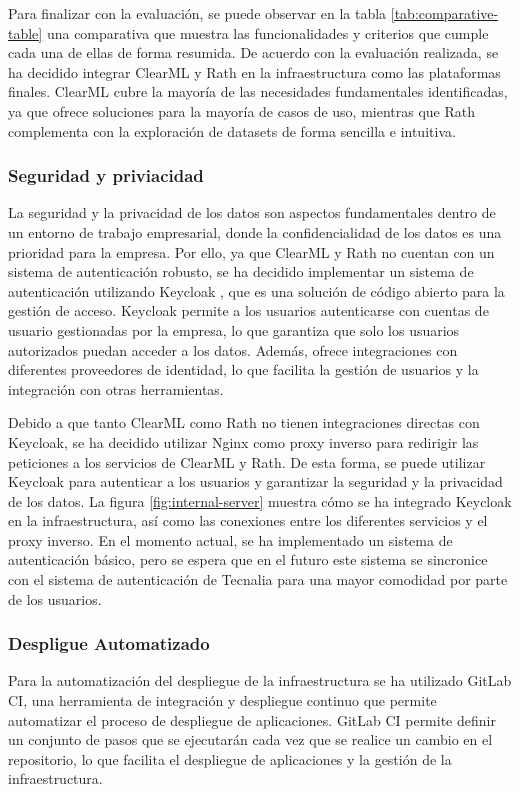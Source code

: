 Para finalizar con la evaluación, se puede observar en la tabla \ref*{tab:comparative-table} 
una comparativa que muestra
las funcionalidades y criterios que cumple cada una de ellas de forma resumida.
De acuerdo con la evaluación realizada, se ha decidido integrar ClearML y Rath
en la infraestructura como las plataformas finales. ClearML cubre la mayoría de
las necesidades fundamentales identificadas, ya que ofrece soluciones para la
mayoría de casos de uso, mientras que Rath complementa con la exploración de
datasets de forma sencilla e intuitiva.  

\subsubsection{Seguridad y priviacidad}
La seguridad y la privacidad de los datos son aspectos fundamentales dentro
de un entorno de trabajo empresarial, donde la confidencialidad de los datos
es una prioridad para la empresa. Por ello, ya que ClearML y Rath no cuentan
con un sistema de autenticación robusto, se ha decidido implementar un sistema
de autenticación utilizando Keycloak \cite{Keycloak}, que es una solución de código abierto
para la gestión de acceso. Keycloak permite a los usuarios autenticarse con
cuentas de usuario gestionadas por la empresa, lo que garantiza que solo los
usuarios autorizados puedan acceder a los datos. Además, ofrece integraciones
con diferentes proveedores de identidad, lo que facilita la gestión de
usuarios y la integración con otras herramientas.\medskip

Debido a que tanto ClearML como Rath no tienen integraciones directas con
Keycloak, se ha decidido utilizar Nginx \cite{nginx} como proxy inverso para redirigir
las peticiones a los servicios de ClearML y Rath. De esta forma, se puede
utilizar Keycloak para autenticar a los usuarios y garantizar la seguridad
y la privacidad de los datos. La figura \ref{fig:internal-server} muestra
cómo se ha integrado Keycloak en la infraestructura, así como las conexiones
entre los diferentes servicios y el proxy inverso. En el momento actual, se
ha implementado un sistema de autenticación básico, pero se espera que en el
futuro este sistema se sincronice con el sistema de autenticación de Tecnalia
para una mayor comodidad por parte de los usuarios.

\subsubsection{Despligue Automatizado}
Para la automatización del despliegue de la infraestructura se ha utilizado
GitLab CI, una herramienta de integración y despliegue continuo que
permite automatizar el proceso de despliegue de aplicaciones. GitLab CI
permite definir un conjunto de pasos que se ejecutarán cada vez que se
realice un cambio en el repositorio, lo que facilita el despliegue de
aplicaciones y la gestión de la infraestructura.\medskip

